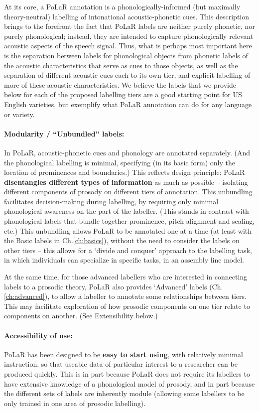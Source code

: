 At its core, a PoLaR annotation is a phonologically-informed (but maximally theory-neutral) labelling of intonational acoustic-phonetic cues. This description brings to the forefront the fact that PoLaR labels are neither purely phonetic, nor purely phonological; instead, they are intended to capture phonologically relevant acoustic aspects of the speech signal. Thus, what is perhaps most important here is the separation between labels for phonological objects from phonetic labels of the acoustic characteristics that serve as cues to those objects, as well as the separation of different acoustic cues each to its own tier, and explicit labelling of more of these acoustic characteristics. We believe the labels that we provide below for each of the proposed labelling tiers are a good starting point for US English varieties, but exemplify what PoLaR annotation can do for any language or variety.

\paragraph{Modularity / “Unbundled” labels:}
In PoLaR, acoustic-phonetic cues and phonology are annotated separately. (And the phonological labelling is minimal, specifying (in its basic form) only the location of prominences and boundaries.) This reflects design principle: PoLaR \textbf{disentangles different types of information} as much as possible – isolating different components of prosody on different tiers of annotation. This unbundling facilitates decision-making during labelling, by requiring only minimal phonological awareness on the part of the labeller. (This stands in contrast with phonological labels that bundle together prominence, pitch alignment and scaling, etc.) This unbundling allows PoLaR to be annotated one at a time (at least with the Basic labels in Ch.\ref{ch:basics}), without the need to consider the labels on other tiers – this allows for a ‘divide and conquer’ approach to the labelling task, in which individuals can specialize in specific tasks, in an assembly line model.

At the same time, for those advanced labellers who are interested in connecting labels to a prosodic theory, PoLaR also provides ‘Advanced’ labels (Ch.\ref{ch:advanced}), to allow a labeller to annotate some relationships between tiers. This may facilitate exploration of how prosodic components on one tier relate to components on another. (See Extensibility below.)

\paragraph{Accessibility of use:}
PoLaR has been designed to be \textbf{easy to start using}, with relatively minimal instruction, so that useable data of particular interest to a researcher can be produced quickly.  This is in part because PoLaR does not require its labellers to have extensive knowledge of a phonological model of prosody, and in part because the different sets of labels are inherently module (allowing some labellers to be only trained in one area of prosodic labelling).

